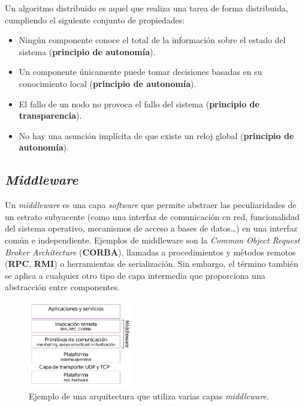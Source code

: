Un algoritmo distribuido es aquel que realiza una tarea de forma distribuida, cumpliendo el siguiente conjunto de propiedades:

\begin{itemize}
  \item Ningún componente conoce el total de la información sobre el estado del sistema (\textbf{principio de autonomía}).
  \item Un componente únicamente puede tomar decisiones basadas en su conocimiento local (\textbf{principio de autonomía}).
  \item El fallo de un nodo no provoca el fallo del sistema (\textbf{principio de transparencia}).
  \item No hay una asunción implícita de que existe un reloj global (\textbf{principio de autonomía}).
\end{itemize}


\subsection{\textit{Middleware}}
\label{teoria:middleware}

Un \textit{middleware} es una capa \textit{software} que permite abstraer las peculiaridades de un estrato subyacente (como una interfaz de comunicación en red, funcionalidad del sistema operativo, mecanismos de acceso a bases de datos\dots) en una interfaz común e independiente. Ejemplos de middleware son la \textit{Common Object Request Broker Architecture} (\textbf{CORBA}), llamadas a procedimientos y métodos remotos (\textbf{RPC}, \textbf{RMI}) o herramientas de serialización. Sin embargo, el término también se aplica a cualquier otro tipo de capa intermedia que proporciona una abstracción entre componentes.

\begin{figure}[H]
\centering
\includegraphics[width=0.4\textwidth]{Chapter2/Figures/middleware-rodrigo}
\caption{Ejemplo de una arquitectura que utiliza varias capas \textit{middleware}.}
\label{fig:middleware-rodrigo}
\end{figure}

